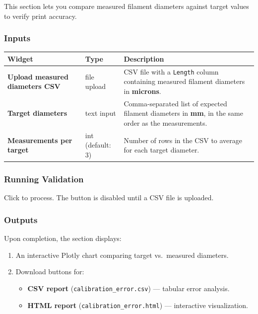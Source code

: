 \documentclass[11pt,letterpaper]{article}
\newcommand{\code}[1]{\texttt{#1}}
\newcommand{\gui}[1]{\textcolor{guicolor}{\textsf{\textbf{#1}}}}
\newcommand{\btn}[1]{\fbox{\textsf{#1}}}
\begin{document}
This section lets you compare measured filament diameters against target values
to verify print accuracy.

\subsubsection{Inputs}

\begin{tabularx}{\textwidth}{L{3.5cm} l X}
\toprule
\textbf{Widget} & \textbf{Type} & \textbf{Description} \\
\midrule
\gui{Upload measured diameters CSV} & file upload & CSV file with a \code{Length} column containing measured filament diameters in \textbf{microns}. \\
\gui{Target diameters} & text input & Comma-separated list of expected filament diameters in \textbf{mm}, in the same order as the measurements. \\
\gui{Measurements per target} & int (default: 3) & Number of rows in the CSV to average for each target diameter. \\
\bottomrule
\end{tabularx}

\subsubsection{Running Validation}

Click \btn{Run Validation} to process. The button is disabled until a CSV file
is uploaded.

\subsubsection{Outputs}

Upon completion, the section displays:

\begin{enumerate}[leftmargin=*]
    \item An interactive Plotly chart comparing target vs.\ measured diameters.
    \item Download buttons for:
    \begin{itemize}[nosep]
        \item \textbf{CSV report} (\code{calibration\_error.csv}) --- tabular error analysis.
        \item \textbf{HTML report} (\code{calibration\_error.html}) --- interactive visualization.
    \end{itemize}
\end{enumerate}
\end{document}

